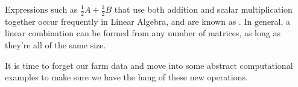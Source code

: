 Expressions such as $\frac12 A+\frac12 B$ that use both addition and scalar multiplication together occur frequently in Linear Algebra, and are known as . In general, a linear combination can be formed from any number of matrices, as long as they're all of the same size.

\smallskip


\smallskip

It is time to forget our farm data and move into some abstract computational examples to make sure we have the hang of these new operations.

\medskip

